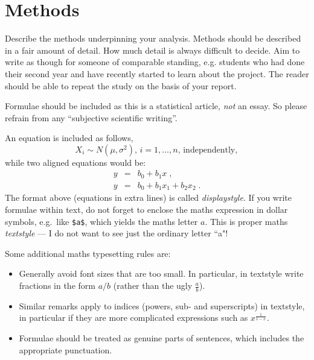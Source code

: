 \documentclass[a4paper,amsmath, 12pt]{article}
\begin{document}
\section{Methods}

Describe the methods underpinning your analysis. Methods should be described in a fair amount of detail. How much detail is always difficult to decide.  Aim to write as though for someone of comparable standing, e.g.  students who had done their second year and have recently started to learn about the project. The reader should be able to repeat the study on the basis of your report.

Formulae should be included as this is a statistical article, \textit{not} an essay. So please refrain from any ``subjective scientific writing''.

An equation is included as follows,
%
\begin{equation}
  X_i \sim N\left(\mu,\sigma^2\right), \, i = 1, \ldots, n, \, \mbox{independently},
\end{equation}
%
while two aligned equations would be:
%
\begin{eqnarray}
  y &=& b_0+b_1x \; , \\
  y &=& b_0+b_1x_1+b_2x_2 \; .
\end{eqnarray}
%
The format above (equations in extra lines) is called \textit{displaystyle}. If you write formulae within text, do not forget to enclose the maths expression in dollar symbols, e.g.\ like \verb|$a$|, which yields the maths letter $a$. This is proper maths  \textit{textstyle} --- I do not want to see just the ordinary letter ``a"!


Some additional maths typesetting rules are:
%
\begin{itemize}
\item Generally avoid font sizes that are too small. In particular, in textstyle write fractions in the form $a/b$ (rather than the ugly $\frac{a}{b}$).

\item Similar remarks apply to indices (powers, sub- and superscripts) in textstyle, in particular if they are more complicated expressions such as $x^{\frac{1}{1-x}}$.

\item Formulae should be treated as genuine parts of sentences, which includes the appropriate punctuation.
\end{itemize}



\end{document}
